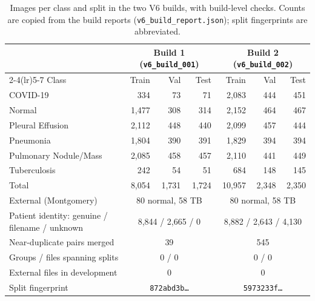 \begin{table}[t]
\centering
\caption{Images per class and split in the two V6 builds, with build-level checks. Counts are copied from the build reports (\texttt{v6\_build\_report.json}); split fingerprints are abbreviated.}
\label{tab:builds}
\small
\begin{tabular}{@{}lrrrrrr@{}}
\toprule
 & \multicolumn{3}{c}{Build 1 (\texttt{v6\_build\_001})} & \multicolumn{3}{c}{Build 2 (\texttt{v6\_build\_002})} \\
\cmidrule(lr){2-4}\cmidrule(lr){5-7}
Class & Train & Val & Test & Train & Val & Test \\
\midrule
COVID-19                & 334   & 73    & 71    & 2,083  & 444   & 451 \\
Normal                  & 1,477 & 308   & 314   & 2,152  & 464   & 467 \\
Pleural Effusion        & 2,112 & 448   & 440   & 2,099  & 457   & 444 \\
Pneumonia               & 1,804 & 390   & 391   & 1,829  & 394   & 394 \\
Pulmonary Nodule/Mass   & 2,085 & 458   & 457   & 2,110  & 441   & 449 \\
Tuberculosis            & 242   & 54    & 51    & 684    & 148   & 145 \\
\midrule
Total                   & 8,054 & 1,731 & 1,724 & 10,957 & 2,348 & 2,350 \\
\midrule
External (Montgomery)   & \multicolumn{3}{c}{80 normal, 58 TB} & \multicolumn{3}{c}{80 normal, 58 TB} \\
Patient identity: genuine / filename / unknown & \multicolumn{3}{c}{8,844 / 2,665 / 0} & \multicolumn{3}{c}{8,882 / 2,643 / 4,130} \\
Near-duplicate pairs merged & \multicolumn{3}{c}{39} & \multicolumn{3}{c}{545} \\
Groups / files spanning splits & \multicolumn{3}{c}{0 / 0} & \multicolumn{3}{c}{0 / 0} \\
External files in development & \multicolumn{3}{c}{0} & \multicolumn{3}{c}{0} \\
Split fingerprint & \multicolumn{3}{c}{\texttt{872abd3b\ldots}} & \multicolumn{3}{c}{\texttt{5973233f\ldots}} \\
\bottomrule
\end{tabular}
\end{table}

